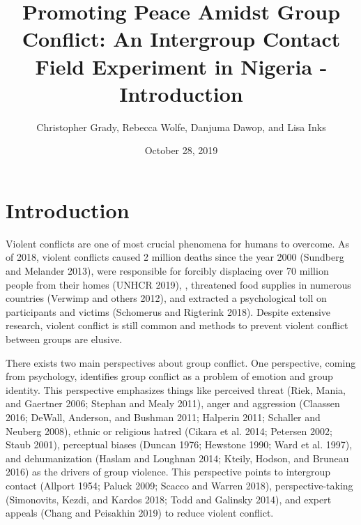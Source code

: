 \documentclass[11pt]{article}
\title{Promoting Peace Amidst Group Conflict: An Intergroup Contact Field
Experiment in Nigeria - Introduction}
\author{
Christopher Grady, Rebecca Wolfe, Danjuma Dawop, and Lisa Inks
}
\date{October 28, 2019}
\begin{document}
\VerbatimFootnotes

%
%
%
%
%
%
%
%
%
%

\maketitle

\hypertarget{introduction}{%
\section{Introduction}\label{introduction}}

Violent conflicts are one of most crucial phenomena for humans to
overcome. As of 2018, violent conflicts caused 2 million deaths since
the year 2000 (Sundberg and Melander 2013), were responsible for
forcibly displacing over 70 million people from their homes (UNHCR
2019), , threatened food supplies in numerous countries (Verwimp and
others 2012), and extracted a psychological toll on participants and
victims (Schomerus and Rigterink 2018). Despite extensive research,
violent conflict is still common and methods to prevent violent conflict
between groups are elusive.

There exists two main perspectives about group conflict. One
perspective, coming from psychology, identifies group conflict as a
problem of emotion and group identity. This perspective emphasizes
things like perceived threat (Riek, Mania, and Gaertner 2006; Stephan
and Mealy 2011), anger and aggression (Claassen 2016; DeWall, Anderson,
and Bushman 2011; Halperin 2011; Schaller and Neuberg 2008), ethnic or
religious hatred (Cikara et al. 2014; Petersen 2002; Staub 2001),
perceptual biases (Duncan 1976; Hewstone 1990; Ward et al. 1997), and
dehumanization (Haslam and Loughnan 2014; Kteily, Hodson, and Bruneau
2016) as the drivers of group violence. This perspective points to
intergroup contact (Allport 1954; Paluck 2009; Scacco and Warren 2018),
perspective-taking (Simonovits, Kezdi, and Kardos 2018; Todd and
Galinsky 2014), and expert appeals (Chang and Peisakhin 2019) to reduce
violent conflict.
\end{document}

